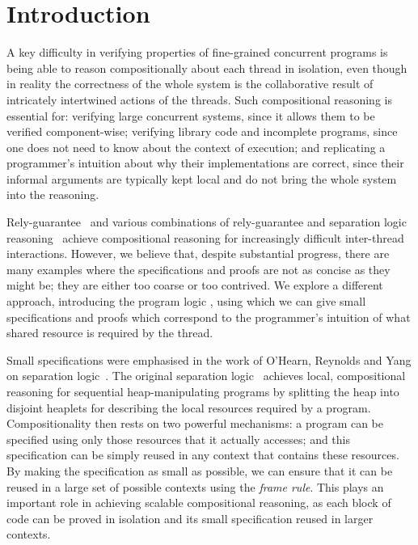 \section{Introduction}
\label{sec:introduction}



A key difficulty in verifying properties of fine-grained concurrent
programs is being able to reason compositionally about each thread in
isolation, even though in reality the correctness of the whole system
is the collaborative result of intricately intertwined actions of the
threads.  Such compositional reasoning is essential for: verifying
large concurrent systems, since it allows them to be verified
component-wise;  verifying library code and incomplete programs,
since one does not need to know about the context of execution; and 
replicating a programmer's intuition about why their implementations
are correct, since their informal arguments are typically  kept local and do
not bring the whole system into the reasoning.


Rely-guarantee~\cite{rg} and various combinations of
rely-guarantee and separation logic
reasoning~\cite{viktor-marriage,dg,lrg,cap-ecoop10,icap,tada} achieve
compositional reasoning for increasingly difficult inter-thread
interactions. However, we believe that, despite substantial progress, there are many
examples where the specifications and proofs are not as concise as
they might be; they  are either too coarse or
too 
contrived. 
We explore a different approach, introducing the
program logic \colosl, using which we can give small
specifications and proofs which correspond to the  programmer's intuition of what shared
resource
is required by the thread. 




Small specifications were emphasised in the work of O'Hearn, Reynolds
and Yang on separation logic~\cite{o2001local}.  The original
separation logic~\cite{rey02,seplog} achieves local, compositional reasoning
for sequential heap-manipulating programs by splitting the heap into
disjoint heaplets for describing the local resources required by a
program. Compositionality then rests on two powerful mechanisms: a program
can be specified using only those resources that it actually accesses;
and this specification can be simply reused in any context that
contains these resources.  By making the specification as small as
possible, we can ensure that it can be reused in a large set of
possible contexts using the {\em frame rule}. This plays an important
role in achieving scalable {compositional reasoning}, as each
block of code can be proved in isolation and its small specification
reused in larger contexts.


